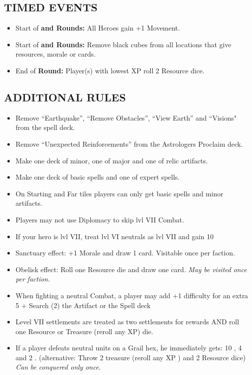 \begin{multicols*}{2}
\subsection*{\MakeUppercase{Timed Events}}

\begin{itemize}
  \item Start of \textbf{ and  Rounds:} All Heroes gain +1 Movement.
  \item Start of \textbf{ and  Rounds:} Remove black cubes from all locations that give resources, morale or cards.
  \item End of \textbf{ Round:} Player(s) with lowest XP roll 2 Resource dice.
\end{itemize}

\subsection*{\MakeUppercase{Additional Rules}}
\begin{itemize}
  \item Remove “Earthquake”,  “Remove Obstacles”, “View Earth” and “Visions" from the spell deck.
  \item Remove “Unexpected Reinforcements” from the Astrologers Proclaim deck.
  \item Make one deck of minor, one of major and one of relic artifacts.
  \item Make one deck of basic spells and one of expert spells.
  \item On Starting and Far tiles players can only get basic spells and minor artifacts.
  \item Players may not use Diplomacy to skip lvl VII Combat.
  \item If your hero is lvl VII, treat lvl VI neutrals as lvl VII and gain 10 
  \item Sanctuary effect: +1 Morale and draw 1 card. Visitable once per faction.
  \item Obelisk effect: Roll one Resource die and draw one card. \textit{May be visited once per faction.}
  \item When fighting a neutral Combat, a player may add +1 difficulty for an extra 5  + Search (2) the Artifact or the Spell deck
  \item Level VII settlements are treated as two settlements for rewards AND roll one Resource or Treasure (reroll any XP) die.
  \item If a player defeats neutral units on a Grail hex, he immediately gets: 10 , 4  and 2 . (alternative: Throw 2 treasure (reroll any XP ) and 2 Resource dice)  \textit{Can be conquered only once.}

\end{itemize}
\end{multicols*}
